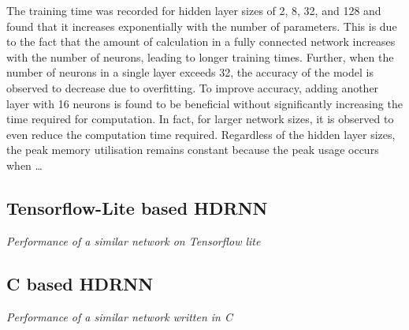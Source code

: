 \begin{center}
\end{center}
The training time was recorded for hidden layer sizes of 2, 8, 32, and 128 and 
found that it increases exponentially with the number of parameters. This is due to 
the fact that the amount of calculation in a fully connected network increases with the 
number of neurons, leading to longer training times. 
Further, when the number of 
neurons in a single layer exceeds 32, the accuracy of the model is observed to decrease 
due to overfitting. To improve accuracy, adding another layer with 16 neurons is found to 
be beneficial without significantly increasing the time required for computation. 
In fact, for larger network sizes, it is observed to even reduce the computation time required. 
Regardless of the hidden layer sizes, the peak memory utilisation remains constant because the 
peak usage occurs when \dots  

\subsection[Tensorflow Lite]{Tensorflow-Lite based HDRNN}
\textit{Performance of a similar network on Tensorflow lite}

\subsection[C]{C based HDRNN}
\textit{Performance of a similar network written in C}


